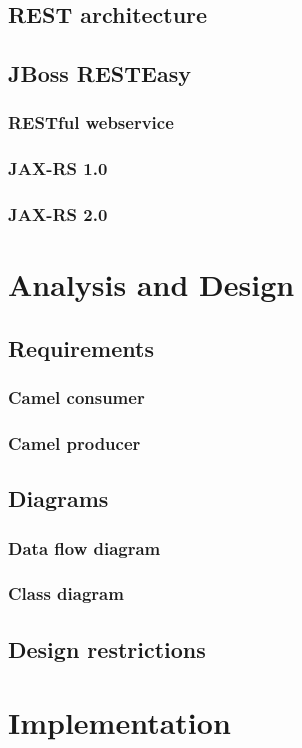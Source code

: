 \documentclass[12pt,final,oneside]{fithesis2}
\begin{document}
\section{REST architecture}
\section{JBoss RESTEasy}
\subsection{RESTful webservice}
\subsection{JAX-RS 1.0}
\subsection{JAX-RS 2.0}

\chapter{Analysis and Design}
\section{Requirements}
\subsection{Camel consumer}
\subsection{Camel producer}
\section{Diagrams}
\subsection{Data flow diagram}
\subsection{Class diagram}
\section{Design restrictions}

\chapter{Implementation}
\end{document}
